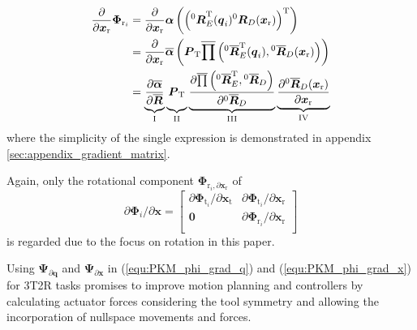 \documentclass{svproc}
\newcommand{\bm}[1]{\boldsymbol{#1}}
\newcommand{\rotmat}[2]{{{ }^{#1}\boldsymbol{R}}_{#2}}
\newcommand{\rotmato}[2]{{{ }^{#1}\boldsymbol{\overline{R}}}_{#2}}
\newcommand{\transp}[0]{{\mathrm{T}}}
\begin{document}
\begin{align}
\frac{\partial}{\partial \bm{x}_{\mathrm{r}}}\bm{\Phi}_{\mathrm{r}_i}
&=
\frac{\partial}{\partial \bm{x}_{\mathrm{r}}} \bm{\alpha}\left(\left(\rotmat{0}{E}^\transp(\bm{q}_i) \rotmat{0}{D}(\bm{x}_{\mathrm{r}})\right)^\transp\right) \label{equ:grad_Phi_x} \\
&=
\frac{\partial}{\partial \bm{x}_{\mathrm{r}}} \overline{\bm{\alpha}}\left(
\bm{P}_{\mathrm{T}}
\overline{\prod}\left( \rotmato{0}{E}^\transp(\bm{q}_i), \rotmato{0}{D}(\bm{x}_{\mathrm{r}})\right)\right) \nonumber \\
&=
\underbrace{\vphantom{\frac{\partial \overline{\prod}\left( \rotmato{0}{E}^\transp, \rotmato{0}{D}\right)}{\partial \rotmato{0}{D}}}
    \frac{\partial \overline{\bm{\alpha}}}{\partial \overline{\bm{R}}}}_{\mathrm{I}}
\underbrace{\vphantom{\frac{\partial \overline{\prod}\left( \rotmato{0}{E}^\transp, \rotmato{0}{D}\right)}{\partial \rotmato{0}{D}}}
    \bm{P}_{\mathrm{T}}}_{\mathrm{II}}
\underbrace{\frac{\partial \overline{\prod}\left( \rotmato{0}{E}^\transp, \rotmato{0}{D}\right)}{\partial \rotmato{0}{D}}}_{\mathrm{III}}
\underbrace{\frac{\partial \rotmato{0}{D}(\bm{x}_{\mathrm{r}})}{\partial \bm{x}_{\mathrm{r}}}}_{\mathrm{IV}} \nonumber
\end{align}
%
where the simplicity of the single expression is demonstrated in appendix\,\ref{sec:appendix_gradient_matrix}.

Again, only the rotational component $\bm{\Phi}_{\mathrm{r}_i,\partial \bm{x}_{\mathrm{r}}}$ of 
%
\begin{equation}
\partial \bm{\Phi}_i/\partial \bm{x}
=
\begin{bmatrix}
\partial\bm{\Phi}_{\mathrm{t}_i}/\partial \bm{x}_{\mathrm{t}} & \partial\bm{\Phi}_{\mathrm{t}_i}/\partial \bm{x}_{\mathrm{r}} \\
\bm{0} & \partial\bm{\Phi}_{\mathrm{r}_i}/\partial \bm{x}_{\mathrm{r}} \\
\end{bmatrix}
\end{equation}
is regarded due to the focus on rotation in this paper.

Using $\bm{\Psi}_{\partial \bm{q}}$ and $\bm{\Psi}_{\partial \bm{x}}$ in (\ref{equ:PKM_phi_grad_q}) and (\ref{equ:PKM_phi_grad_x}) for 3T2R tasks promises to improve motion planning and controllers by calculating actuator forces considering the tool symmetry and allowing the incorporation of nullspace movements and forces.
\end{document}
